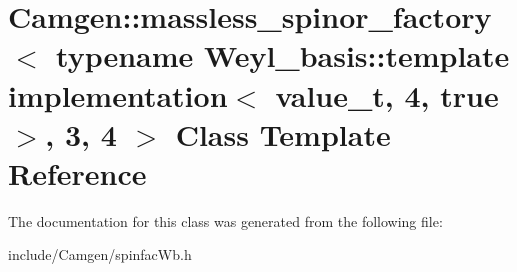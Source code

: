 \hypertarget{a00362}{}\section{Camgen\+:\+:massless\+\_\+spinor\+\_\+factory$<$ typename Weyl\+\_\+basis\+:\+:template implementation$<$ value\+\_\+t, 4, true $>$, 3, 4 $>$ Class Template Reference}
\label{a00362}


The documentation for this class was generated from the following file\+:\begin{DoxyCompactItemize}
\item 
include/\+Camgen/spinfac\+Wb.\+h\end{DoxyCompactItemize}
